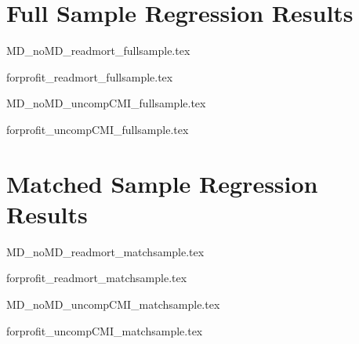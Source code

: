 \documentclass[12pt]{article}
\begin{document}
\section{Full Sample Regression Results}

{MD_noMD_readmort_fullsample.tex}

{forprofit_readmort_fullsample.tex}

{MD_noMD_uncompCMI_fullsample.tex}

{forprofit_uncompCMI_fullsample.tex}

\section{Matched Sample Regression Results}

{MD_noMD_readmort_matchsample.tex}

{forprofit_readmort_matchsample.tex}

{MD_noMD_uncompCMI_matchsample.tex}

{forprofit_uncompCMI_matchsample.tex}



    

    

    

    

    

    

	
	
	
\end{document}
